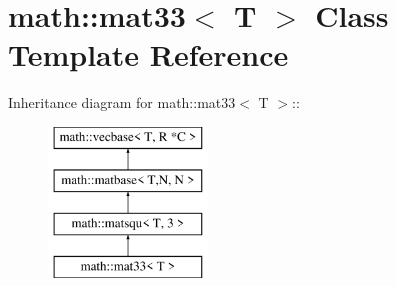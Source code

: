 \hypertarget{classmath_1_1mat33}{
\section{math::mat33$<$ T $>$ Class Template Reference}
\label{classmath_1_1mat33}
}
Inheritance diagram for math::mat33$<$ T $>$::\begin{figure}[H]
\begin{center}
\leavevmode
\includegraphics[height=4cm]{classmath_1_1mat33}
\end{center}
\end{figure}
